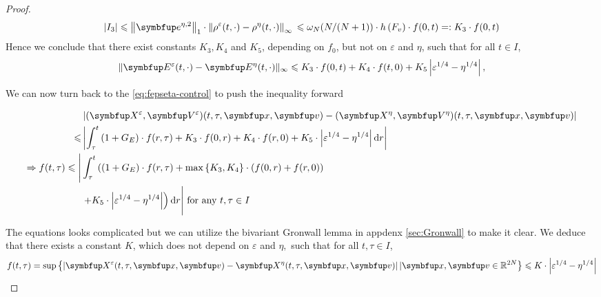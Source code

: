 \begin{lemma}
\begin{proof}
\[
\left|I_{3}\right|  \leqslant\left\|\vect{e}^{\eta, 2} \right\|_1 \cdot \left\| \rho^{\varepsilon}(t, \cdot)-\rho^{\eta}(t, \cdot)\right\|_{\infty} \\
  \leqslant \omega_{N}(N /(N+1)) \cdot h\left(F_{v}\right) \cdot f(0, t)=: K_{3} \cdot f(0, t)
\]
Hence we conclude that there exist constants $K_{3}, K_{4}$ and $K_{5}$, depending on $f_{0}$, but not on $\varepsilon$ and $\eta$, such that for all $t \in I$, 
\begin{equation}
    \|\vE^{\varepsilon}(t, \cdot)-\vE^{\eta}(t, \cdot)\|_{\infty} \leqslant K_{3} \cdot f(0, t)+K_{4} \cdot f(t, 0) +K_{5}\left|\varepsilon^{1 / 4}-\eta^{1 / 4}\right|,
\end{equation}

We can now turn back to the \eqref{eq:fepseta-control} to push the inequality forward

\begin{equation}
    \begin{aligned}
        & \left|(\vect{X}^{\varepsilon}, \vect{V}^\varepsilon)(t, \tau, \vx,\vv)- (\vect{X}^{\eta}, \vect{V}^\eta)(t, \tau, \vx, \vv) \right| \\
        \leqslant &\left| \int_{\tau}^{t}\left(1+G_{E}\right) \cdot f(r, \tau)+K_{3} \cdot f(0, r)+K_{4} \cdot f(r, 0)+K_{5} \cdot\left|\varepsilon^{1 / 4}-\eta^{1 / 4}\right| \mathrm{d} r \right|\\
        \Rightarrow f(t, \tau) \leqslant \Bigg| & \int_{\tau}^{t}\left(\left(1+G_{E}\right) \cdot f(r, \tau)+\max \left\{K_{3}, K_{4}\right\} \cdot(f(0, r)+f(r, 0))\right.\\
        &\left.+K_{5} \cdot\left|\varepsilon^{1 / 4}-\eta^{1 / 4}\right|\right) \mathrm{d} r \Bigg| \text{ for any } t, \tau \in I
        \end{aligned} 
\end{equation}

The equations looks complicated but we can utilize the bivariant Gronwall lemma in appdenx \ref{sec:Gronwall} to make it clear. We deduce that there exists a constant $K$, which does not depend on $\varepsilon$ and $\eta,$ such that for all $t, \tau \in I$,
\begin{equation}
     f(t, \tau)=\sup \left\{\left|\vect{X}^{\varepsilon}(t, \tau, \vx, \vv)-\vect{X}^{\eta}(t, \tau, \vx, \vv)\right| |\vx, \vv\in \bbR^{2 N}\right\} \leqslant K \cdot\left|\varepsilon^{1 / 4}-\eta^{1 / 4}\right|
\end{equation}

\end{proof}






\end{lemma}
